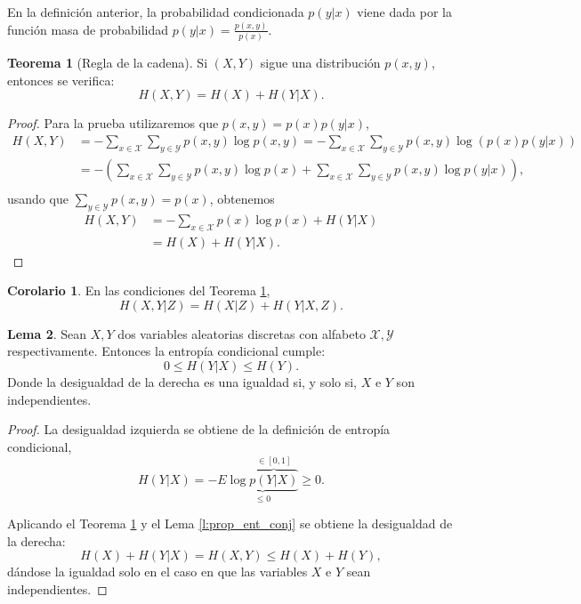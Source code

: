 \documentclass[10pt,a4paper]{article} %
\theoremstyle{definition}
\newtheorem{theorem}{Teorema}[section]
\newtheorem{lemma}[theorem]{Lema}
\newtheorem{corollary}{Corolario}[theorem]
\begin{document}
En la definición anterior, la probabilidad condicionada $p(y|x)$ viene dada por la función masa de probabilidad $p(y|x) = \frac{p(x,y)}{p(x)}$.

\begin{theorem}[Regla de la cadena]\label{t:regla_cadena}
  Si $(X,Y)$ sigue una distribución $p(x,y)$, entonces se verifica:\[
H(X,Y) = H(X) + H(Y|X).
  \]
\end{theorem}

\begin{proof}
Para la prueba utilizaremos que $p(x,y) = p(x)p(y|x)$,
  \begin{align*}
    H(X,Y) &= - \sum_{x \in \mathcal{X}} \sum_{y \in \mathcal{Y}} p(x,y) \log p(x,y) = - \sum_{x \in \mathcal{X}} \sum_{y \in \mathcal{Y}} p(x,y) \log \left( p(x)p(y|x) \right )\\
    &= - \left(\sum_{x \in \mathcal{X}} \sum_{y \in \mathcal{Y}} p(x,y) \log p(x) + \sum_{x \in \mathcal{X}} \sum_{y \in \mathcal{Y}} p(x,y) \log p(y|x) \right ),\\
  \end{align*}
usando que $\sum_{y\in \mathcal{Y}}p(x,y) = p(x)$, obtenemos
\begin{align*}
  H(X,Y) &= - \sum_{x \in \mathcal{X}} p(x) \log p(x) + H(Y|X)\\
    &= H(X) + H(Y|X).
  \end{align*}
\end{proof}

\begin{corollary} En las condiciones del Teorema \ref{t:regla_cadena},\[
H(X,Y|Z) = H(X|Z) + H(Y|X, Z).
  \]
\end{corollary}

\begin{lemma}
  Sean $X, Y$ dos variables aleatorias discretas con alfabeto $\mathcal{X}, \mathcal{Y}$ respectivamente. Entonces la entropía condicional cumple:\[
0 \leq H(Y|X) \leq H(Y).
\]
Donde la desigualdad de la derecha es una igualdad si, y solo si, $X$ e $Y$ son independientes.
\end{lemma}

\begin{proof}
  La desigualdad izquierda se obtiene de la definición de entropía condicional, \[H(Y|X) = - E \underbrace{\log \overbrace{p(Y|X)}^{\in [0,1]}}_{\leq 0} \ge 0.\]

  Aplicando el Teorema \ref{t:regla_cadena} y el Lema \ref{l:prop_ent_conj} se obtiene la desigualdad de la derecha:\[
H(X) + H(Y|X) = H(X,Y) \leq H(X) + H(Y),
\]
dándose la igualdad solo en el caso en que las variables $X$ e $Y$ sean independientes.
\end{proof}
\end{document}

